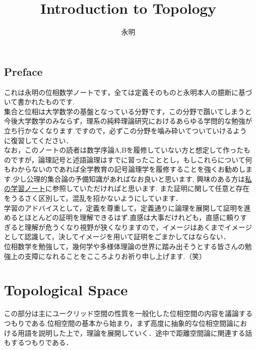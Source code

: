 \documentclass[dvipdfmx]{jbook}
\theoremstyle{remark}
\theoremstyle{plain}
\begin{document}
\title{Introduction to Topology}
\author{永明}
\maketitle
\chapter*{Preface}
これは永明の位相数学ノートです，全ては定義そのものと永明本人の臆断に基づいて書かれたものです.\\
集合と位相は大学数学の基盤となっている分野です，この分野で躓いてしまうと今後大学数学のみならず，理系の純粋理論研究におけるあらゆる学問的な勉強が立ち行かなくなります.ですので，必ずこの分野を噛み砕いてついていけるように復習してください．\\
なお，このノートの読者は数学序論A,Bを履修していない方と想定して作ったものですが，論理記号と述語論理はすでに習ったこととし，もしこれらについて何もわからないのであれば全学教育の記号論理学を履修することを強くお勧めします.少し公理的集合論の予備知識があればなお良いと思います, 興味のある方は\href{https://top-xiao.github.io/blog}{私の学習ノート}に参照していただければと思います. また証明に関して任意と存在をうるさく区別して，混乱を招かないようにしています．\\
学習のアドバイスとして，定義を尊重して，定義通りに論理を展開して証明を進めるとほとんどの証明を理解できるはず.直感は大事だけれども，直感に頼りすぎると理解が危うくなり視野が狭くなりますので，イメージはあくまでイメージとして認識して，決してイメージを用いて証明をごまかしてはならない．\\
位相数学を勉強して，幾何学や多様体理論の世界に踏み出そうとする皆さんの勉強上の支障になれることをこころよりお祈り申し上げます.（笑）
\newpage

\tableofcontents
{}
\newpage

















\part{Topological Space}
この部分は主にユークリッド空間の性質を一般化した位相空間の内容を議論するつもりである.位相空間の基本から始まり，まず高度に抽象的な位相空間論における用語を説明した上で，理論を展開していく．途中で距離空間論に関連する話もするつもりである．
\end{document}
